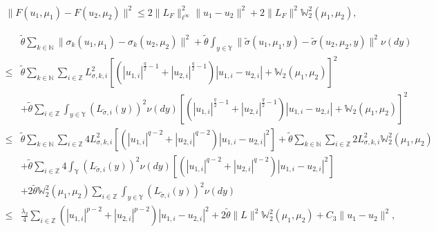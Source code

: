 \documentclass[10pt,a4paper]{amsart}
\begin{document}
 \begin{align}\label{F2}
    \| F(u_1,\mu_1) - F(u_2,\mu_2) \|^2
    \le 2 \|L_{F}\|_{\ell^\infty}^2 \|u_1 - u_2\|^2
         + 2 \|L_{F}\|^2\mathbb{W}_2^2(\mu_1,\mu_2),
 \end{align}

 \begin{align} \label{sigma4}
      & \tilde{\theta}\sum_{k \in \mathbb{N}}
               \|\sigma_k(u_1,\mu_1) - \sigma_k(u_2,\mu_2)\|^2
        +
   \tilde{\theta}    
                  \int_{y\in \mathbb{Y}
                  }
                          \|\widetilde{\sigma}(u_1,\mu_1,y) - \widetilde{\sigma}(u_2, \mu_2, y)\|^2\nu (dy)  \nonumber \\
 \le & \tilde{\theta} \sum_{k \in \mathbb{N} } \sum_{i \in \mathbb{Z}}
         L^2_{\sigma, k,i}
              \left[
                     \left( | u_{1,i} |^{\frac{q}{2} - 1}  + | u_{2,i} |^{\frac{q}{2} - 1} \right)
                     | u_{1,i} - u_{2,i} |
                     + \mathbb{W}_2(\mu_1, \mu_2)
              \right]^2  \nonumber\\
      & + \tilde{\theta}   \sum_{i \in \mathbb{Z}}
             \int_{y \in \mathbb{Y}}
                 \left( L_{\widetilde{\sigma}, i} (y) \right )^2 \nu(dy)
                       \left[
                                \left( | u_{1,i} |^{\frac{q}{2} - 1}  + | u_{2,i} |^{\frac{q}{2} - 1} \right)
                                | u_{1,i} - u_{2,i} |
                                + \mathbb{W}_2(\mu_1, \mu_2)
                       \right]^2  \nonumber\\
 \le & \tilde{\theta} \sum_{k \in \mathbb{N} } \sum_{i \in \mathbb{Z}}
         4 L^2_{\sigma, k,i}
                \left[
                       \left( | u_{1,i} |^{q-2} + | u_{2,i} |^{q-2} \right)
                       | u_{1,i} - u_{2,i} |^2
                \right]
           + \tilde{\theta} 
                  \sum_{k \in \mathbb{N} } 
                        \sum_{i \in \mathbb{Z}}  2 L^2_{\sigma, k,i} \mathbb{W}_2^2(\mu_1, \mu_2)  \nonumber\\
      & + \tilde{\theta}   \sum_{i \in \mathbb{Z}}
             4 \int_{\mathbb{Y}}
                    \left( L _{\widetilde{\sigma}, i}(y) \right )^2 \nu(dy)
                         \left[
                                  \left( | u_{1,i} |^{q-2} + | u_{2,i} |^{q-2} \right)
                                  | u_{1,i} - u_{2,i} |^2
                         \right]  \nonumber\\
      & + 2 \tilde{\theta}    
                   \mathbb{W}_2^2(\mu_1, \mu_2) 
                          \sum_{i \in \mathbb{Z}}   
                              \int_{y \in \mathbb{Y}}
                                  \left ( L_{\widetilde{\sigma}, i} (y) \right )^2 \nu(dy)  \nonumber\\
 \le & \frac{\lambda_2}{4}
              \sum_{ i \in \mathbb{Z}} 
                    \left( |u_{1,i}|^{p-2} + |u_{2,i}|^{p-2} \right) |u_{1,i} - u_{2,i}|^2
         + 2 \tilde{\theta} \| L \|^2 
                    \mathbb{W}_2^2(\mu_1, \mu_2)
         + C_3 \|u_1 - u_2 \|^2,
 \end{align}
\end{document}
